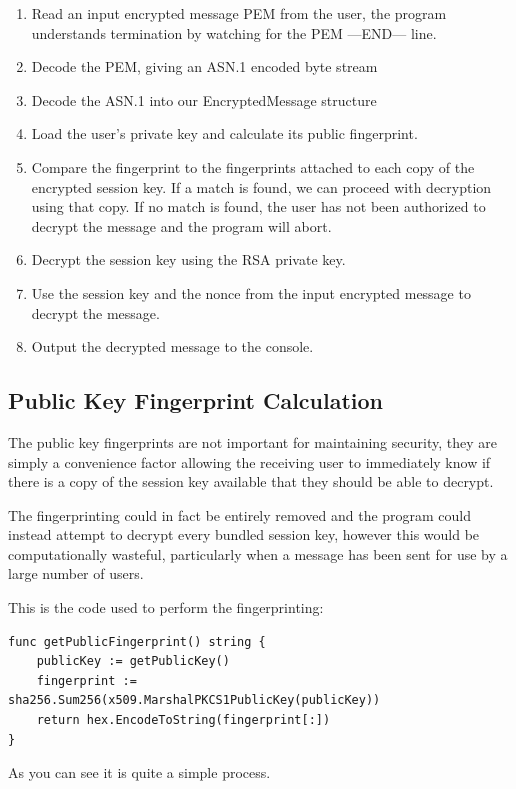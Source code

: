\documentclass{article}[12pt]
\begin{document}
			\begin{enumerate}
				\item Read an input encrypted message PEM from the user, the program understands termination by watching for the PEM ---END--- line.
				\item Decode the PEM, giving an ASN.1 encoded byte stream
				\item Decode the ASN.1 into our EncryptedMessage structure
				\item Load the user's private key and calculate its public fingerprint.
				\item Compare the fingerprint to the fingerprints attached to each copy of the encrypted session key. If a match is found, we can proceed with decryption using that copy. If no match is found, the user has not been authorized to decrypt the message and the program will abort.
				\item Decrypt the session key using the RSA private key.
				\item Use the session key and the nonce from the input encrypted message to decrypt the message.
				\item Output the decrypted message to the console.
			\end{enumerate}
		
		\subsection{Public Key Fingerprint Calculation}
			The public key fingerprints are not important for maintaining security, they are simply a convenience factor allowing the receiving user to immediately know if there is a copy of the session key available that they should be able to decrypt.
			
			The fingerprinting could in fact be entirely removed and the program could instead attempt to decrypt every bundled session key, however this would be computationally wasteful, particularly when a message has been sent for use by a large number of users.
			
			This is the code used to perform the fingerprinting:
			
			\begin{lstlisting}
func getPublicFingerprint() string {
	publicKey := getPublicKey()
	fingerprint := sha256.Sum256(x509.MarshalPKCS1PublicKey(publicKey))
	return hex.EncodeToString(fingerprint[:])
}
			\end{lstlisting}
			
			As you can see it is quite a simple process.
			
\end{document}
